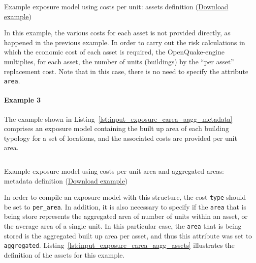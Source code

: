\begin{listing}[htbp]
  \inputminted[firstline=19,firstnumber=19,lastline=29,fontsize=\footnotesize,frame=single,linenos,bgcolor=lightgray]{xml}{oqum/risk/Verbatim/input_exposure_cunit.xml}
  \caption{Example exposure model using costs per unit: assets definition (\href{https://raw.githubusercontent.com/GEMScienceTools/oq-engine-docs/master/oqum/risk/verbatim/input_exposure_cunit.xml}{Download example})}
  \label{lst:input_exposure_cunit_assets}
\end{listing}

In this example, the various costs for each asset is not provided directly, as
happened in the previous example. In order to carry out the risk calculations
in which the economic cost of each asset is required, the OpenQuake-engine
multiplies, for each asset, the number of units (buildings) by the ``per
asset'' replacement cost. Note that in this case, there is no need to specify
the attribute \Verb+area+.


\paragraph{Example 3}

The example shown in Listing~\ref{lst:input_exposure_carea_aagg_metadata}
comprises an \gls{exposure model} containing the built up area of each
building typology for a set of locations, and the associated costs are
provided per unit area.

\begin{listing}[htbp]
  \inputminted[firstline=8,firstnumber=8,lastline=20,fontsize=\footnotesize,frame=single,linenos,bgcolor=lightgray]{xml}{oqum/risk/Verbatim/input_exposure_carea_aagg.xml}
  \caption{Example exposure model using costs per unit area and aggregated areas: metadata definition (\href{https://raw.githubusercontent.com/GEMScienceTools/oq-engine-docs/master/oqum/risk/verbatim/input_exposure_carea_aagg.xml}{Download example})}
  \label{lst:input_exposure_carea_aagg_metadata}
\end{listing}

In order to compile an \gls{exposure model} with this structure, the cost
\Verb+type+ should be set to \Verb+per_area+. In addition, it is also
necessary to specify if the \Verb+area+ that is being store represents the
aggregated area of number of units within an asset, or the average area of a
single unit. In this particular case, the \Verb+area+ that is being stored is
the aggregated built up area per asset, and thus this attribute was set to
\Verb+aggregated+. Listing~\ref{lst:input_exposure_carea_aagg_assets}
illustrates the definition of the assets for this example.

